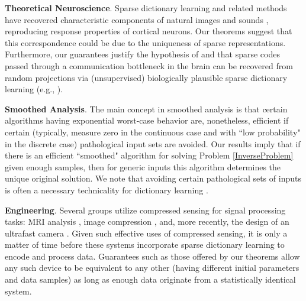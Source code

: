 \documentclass[9pt,twocolumn]{pnas-new}
\begin{document}
\textbf{Theoretical Neuroscience}.
Sparse dictionary learning and related methods have recovered characteristic components of natural images \cite{Olshausen96, hurri1996image, bell1997independent, van1998independent} and sounds \cite{bellsejnowski1996, smithlewicki2006, Carlson12}, reproducing response properties of cortical neurons. Our theorems suggest that this correspondence could be due to the uniqueness of sparse representations. Furthermore, our guarantees justify the hypothesis of \cite{Coulter10} and \cite{Isely10} that sparse codes passed through a communication bottleneck in the brain can be recovered from random projections via (unsupervised) biologically plausible sparse dictionary learning (e.g., \cite{rehnsommer2007, rozell2007neurally, hu2014hebbian}).   

\textbf{Smoothed Analysis}.
The main concept in smoothed analysis \cite{Spielman04} is that certain algorithms having exponential worst-case behavior are, nonetheless, efficient if certain (typically, measure zero in the continuous case and with ``low probability" in the discrete case) pathological input sets are avoided. Our results imply that if there is an efficient ``smoothed" algorithm for solving Problem \ref{InverseProblem} given enough samples, then for generic inputs this algorithm determines the unique original solution. We note that avoiding certain pathological sets of inputs is often a necessary technicality for dictionary learning \cite{Razaviyayn15, Tillmann15}.

\textbf{Engineering}.
Several groups utilize compressed sensing for signal processing tasks: MRI analysis \cite{lustig2008compressed},  image compression \cite{Duarte08}, and, more recently, the design of an ultrafast camera \cite{Gao14}. Given such effective uses of compressed sensing, it is only a matter of time before these systems incorporate sparse dictionary learning to encode and process data. Guarantees such as those offered by our theorems allow any such device to be equivalent to any other (having different initial parameters and data samples) as long as enough data originate from a statistically identical system.


\end{document}
